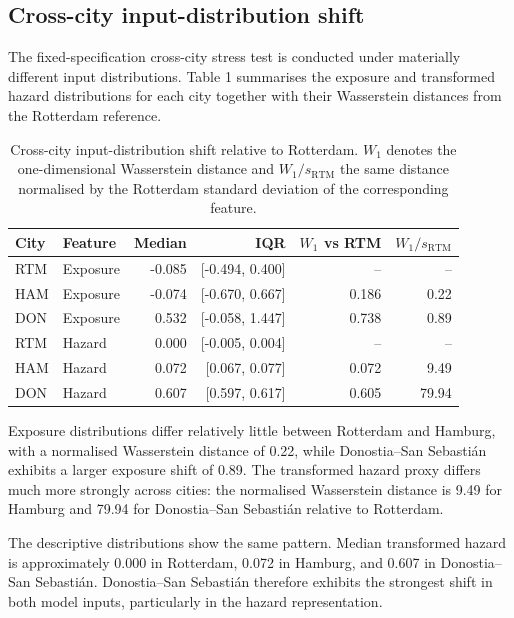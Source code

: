 \documentclass[
]{article}
\begin{document}
\FloatBarrier

\subsection{Cross-city input-distribution
shift}\label{cross-city-input-distribution-shift}

The fixed-specification cross-city stress test is conducted under
materially different input distributions. Table 1 summarises the
exposure and transformed hazard distributions for each city together
with their Wasserstein distances from the Rotterdam reference.

\begin{table}[H]
\centering
\small
\begin{tabular}{llrrrr}
\toprule
City & Feature & Median & IQR & $W_1$ vs RTM & $W_1 / s_{\mathrm{RTM}}$ \\
\midrule
RTM & Exposure & -0.085 & [-0.494, 0.400] & -- & -- \\
HAM & Exposure & -0.074 & [-0.670, 0.667] & 0.186 & 0.22 \\
DON & Exposure & 0.532 & [-0.058, 1.447] & 0.738 & 0.89 \\
RTM & Hazard & 0.000 & [-0.005, 0.004] & -- & -- \\
HAM & Hazard & 0.072 & [0.067, 0.077] & 0.072 & 9.49 \\
DON & Hazard & 0.607 & [0.597, 0.617] & 0.605 & 79.94 \\
\bottomrule
\end{tabular}
\caption{Cross-city input-distribution shift relative to Rotterdam. $W_1$ denotes the one-dimensional Wasserstein distance and $W_1 / s_{\mathrm{RTM}}$ the same distance normalised by the Rotterdam standard deviation of the corresponding feature.}
\end{table}

Exposure distributions differ relatively little between Rotterdam and
Hamburg, with a normalised Wasserstein distance of 0.22, while
Donostia--San Sebastián exhibits a larger exposure shift of 0.89. The
transformed hazard proxy differs much more strongly across cities: the
normalised Wasserstein distance is 9.49 for Hamburg and 79.94 for
Donostia--San Sebastián relative to Rotterdam.

The descriptive distributions show the same pattern. Median transformed
hazard is approximately 0.000 in Rotterdam, 0.072 in Hamburg, and 0.607
in Donostia--San Sebastián. Donostia--San Sebastián therefore exhibits
the strongest shift in both model inputs, particularly in the hazard
representation.
\end{document}
